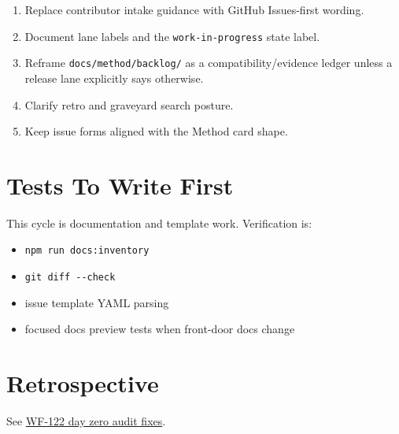 \begin{enumerate}
\def\labelenumi{\arabic{enumi}.}
\tightlist
\item
  Replace contributor intake guidance with GitHub Issues-first wording.
\item
  Document lane labels and the \texttt{w\allowbreak{}o\allowbreak{}r\allowbreak{}k\allowbreak{}-\allowbreak{}i\allowbreak{}n\allowbreak{}-\allowbreak{}p\allowbreak{}r\allowbreak{}o\allowbreak{}g\allowbreak{}r\allowbreak{}e\allowbreak{}s\allowbreak{}s} state label.
\item
  Reframe \texttt{d\allowbreak{}o\allowbreak{}c\allowbreak{}s\allowbreak{}/\allowbreak{}m\allowbreak{}e\allowbreak{}t\allowbreak{}h\allowbreak{}o\allowbreak{}d\allowbreak{}/\allowbreak{}b\allowbreak{}a\allowbreak{}c\allowbreak{}k\allowbreak{}l\allowbreak{}o\allowbreak{}g\allowbreak{}/} as a compatibility/evidence ledger unless a release lane explicitly says otherwise.
\item
  Clarify retro and graveyard search posture.
\item
  Keep issue forms aligned with the Method card shape.
\end{enumerate}

\section{Tests To Write First}\label{record-207-tests-to-write-first}

This cycle is documentation and template work. Verification is:

\begin{itemize}
\tightlist
\item
  \texttt{n\allowbreak{}p\allowbreak{}m\allowbreak{} \allowbreak{}r\allowbreak{}u\allowbreak{}n\allowbreak{} \allowbreak{}d\allowbreak{}o\allowbreak{}c\allowbreak{}s\allowbreak{}:\allowbreak{}i\allowbreak{}n\allowbreak{}v\allowbreak{}e\allowbreak{}n\allowbreak{}t\allowbreak{}o\allowbreak{}r\allowbreak{}y}
\item
  \texttt{g\allowbreak{}i\allowbreak{}t\allowbreak{} \allowbreak{}d\allowbreak{}i\allowbreak{}f\allowbreak{}f\allowbreak{} \allowbreak{}-\allowbreak{}-\allowbreak{}c\allowbreak{}h\allowbreak{}e\allowbreak{}c\allowbreak{}k}
\item
  issue template YAML parsing
\item
  focused docs preview tests when front-door docs change
\end{itemize}

\section{Retrospective}\label{record-207-retrospective}

See \href{https://github.com/flyingrobots/bijou/blob/cbd70612140e7a450d764b3c7be1c6af878b99bc/docs/method/retro/WF-122-day-zero-audit-fixes.md}{WF-122 day zero audit fixes}.

